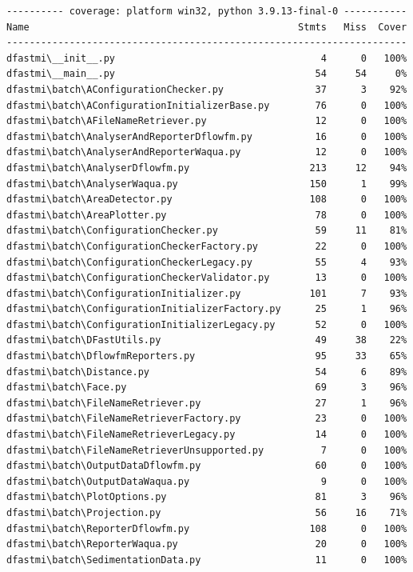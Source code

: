 \begin{Verbatim}
---------- coverage: platform win32, python 3.9.13-final-0 -----------
Name                                               Stmts   Miss  Cover
----------------------------------------------------------------------
dfastmi\__init__.py                                    4      0   100%
dfastmi\__main__.py                                   54     54     0%
dfastmi\batch\AConfigurationChecker.py                37      3    92%
dfastmi\batch\AConfigurationInitializerBase.py        76      0   100%
dfastmi\batch\AFileNameRetriever.py                   12      0   100%
dfastmi\batch\AnalyserAndReporterDflowfm.py           16      0   100%
dfastmi\batch\AnalyserAndReporterWaqua.py             12      0   100%
dfastmi\batch\AnalyserDflowfm.py                     213     12    94%
dfastmi\batch\AnalyserWaqua.py                       150      1    99%
dfastmi\batch\AreaDetector.py                        108      0   100%
dfastmi\batch\AreaPlotter.py                          78      0   100%
dfastmi\batch\ConfigurationChecker.py                 59     11    81%
dfastmi\batch\ConfigurationCheckerFactory.py          22      0   100%
dfastmi\batch\ConfigurationCheckerLegacy.py           55      4    93%
dfastmi\batch\ConfigurationCheckerValidator.py        13      0   100%
dfastmi\batch\ConfigurationInitializer.py            101      7    93%
dfastmi\batch\ConfigurationInitializerFactory.py      25      1    96%
dfastmi\batch\ConfigurationInitializerLegacy.py       52      0   100%
dfastmi\batch\DFastUtils.py                           49     38    22%
dfastmi\batch\DflowfmReporters.py                     95     33    65%
dfastmi\batch\Distance.py                             54      6    89%
dfastmi\batch\Face.py                                 69      3    96%
dfastmi\batch\FileNameRetriever.py                    27      1    96%
dfastmi\batch\FileNameRetrieverFactory.py             23      0   100%
dfastmi\batch\FileNameRetrieverLegacy.py              14      0   100%
dfastmi\batch\FileNameRetrieverUnsupported.py          7      0   100%
dfastmi\batch\OutputDataDflowfm.py                    60      0   100%
dfastmi\batch\OutputDataWaqua.py                       9      0   100%
dfastmi\batch\PlotOptions.py                          81      3    96%
dfastmi\batch\Projection.py                           56     16    71%
dfastmi\batch\ReporterDflowfm.py                     108      0   100%
dfastmi\batch\ReporterWaqua.py                        20      0   100%
dfastmi\batch\SedimentationData.py                    11      0   100%

\end{Verbatim}
